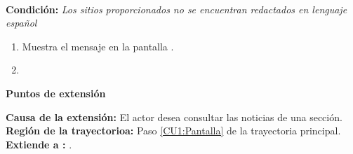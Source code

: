 \begin{large}
	\\
\end{large}	
\textbf{Condición:} \textit{Los sitios proporcionados no se encuentran redactados en lenguaje español}

\begin{enumerate}[{B-}1.]

	\item \sistema Muestra el mensaje   en la pantalla .
	\item \finCU	

\end{enumerate}


\begin{large}
	\textbf{Puntos de extensión}\\
\end{large}	

\textbf{Causa de la extensión:} El actor desea consultar las noticias de una sección.\\
\textbf{Región de la trayectorioa:} Paso \ref{CU1:Pantalla} de la trayectoria principal.\\
\textbf{Extiende a :} .\\\\



